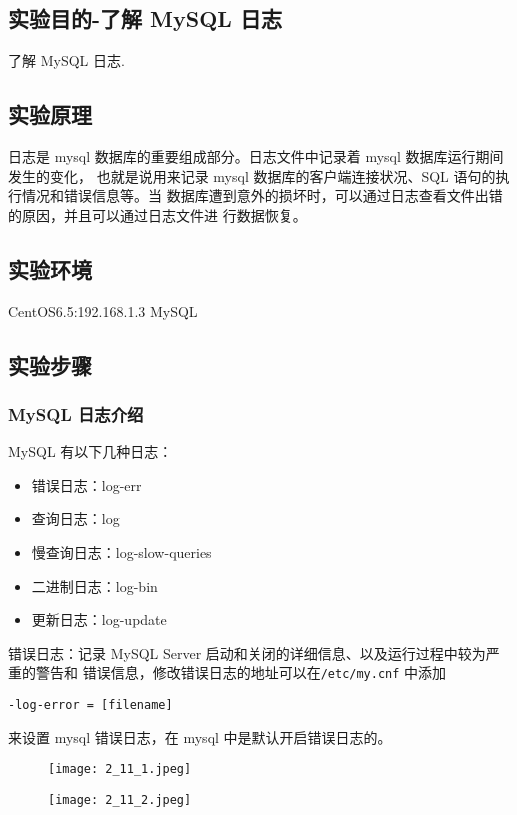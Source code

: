 \subsection{实验目的-了解 MySQL 日志}
了解 MySQL 日志.
%
\subsection{实验原理}
日志是 mysql 数据库的重要组成部分。日志文件中记录着 mysql 数据库运行期间发生的变化，
也就是说用来记录 mysql 数据库的客户端连接状况、SQL 语句的执行情况和错误信息等。当
数据库遭到意外的损坏时，可以通过日志查看文件出错的原因，并且可以通过日志文件进
行数据恢复。
%
\subsection{实验环境}
CentOS6.5:192.168.1.3 MySQL
%
\subsection{实验步骤}
\subsubsection{MySQL 日志介绍}
MySQL 有以下几种日志：
\begin{itemize}
  \item 错误日志：log-err
  \item 查询日志：log
  \item 慢查询日志：log-slow-queries
  \item 二进制日志：log-bin
  \item 更新日志：log-update
\end{itemize}
%
错误日志：记录 MySQL Server 启动和关闭的详细信息、以及运行过程中较为严重的警告和
错误信息，修改错误日志的地址可以在\texttt{/etc/my.cnf} 中添加
\begin{verbatim}
-log-error = [filename]
\end{verbatim}
来设置 mysql 错误日志，在 mysql 中是默认开启错误日志的。
\begin{figure}[H]
  \begin{center}
    \texttt{[image: 2\_11\_1.jpeg]}
  \end{center}
\end{figure}
\begin{figure}[H]
  \begin{center}
    \texttt{[image: 2\_11\_2.jpeg]}
  \end{center}
\end{figure}

